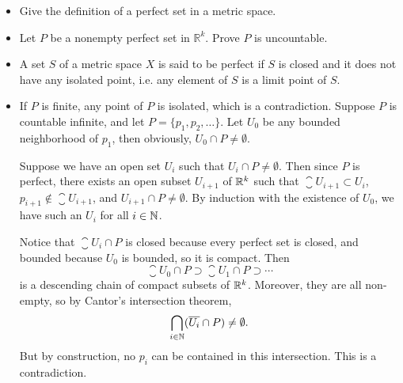 \begin{problem}
\begin{itemize}
    \item[(a)] Give the definition of a perfect set in a metric space.
    \item[(b)] Let $P$ be a nonempty perfect set in $\mathbb{R}^k$. Prove $P$ is uncountable.
\end{itemize}
\begin{solution}
\begin{itemize}
    \item[(a)] A set $S$ of a metric space $X$ is said to be perfect if $S$ is closed and it does not have any isolated point, i.e. any element of $S$ is a limit point of $S.$  
    \item[(b)]If $P$ is finite, any point of $P$ is isolated, which is a contradiction. Suppose $P$ is countable infinite, and let $P = \{p_1, p_2, \ldots\}$. Let $U_0$ be any bounded neighborhood of $p_1$, then obviously, $U_0\cap P\ne\emptyset.$
    
    Suppose we have an open set $U_i$ such that $U_i \cap P \neq
    \emptyset$. Then since $P$ is perfect, there exists an open subset $U_{i+1}$ of $\mathbb{R}^k$ such that $\closure{U_{i+1}} \subset U_i$, $p_{i+1} \notin \closure{U_{i+1}}$, and $U_{i+1} \cap P \neq \emptyset$. By induction with the existence of $U_0$, we have such an $U_i$ for all $i \in \mathbb{N}$.
    
    Notice that $\closure{U_i} \cap P$ is closed because every perfect set is closed, and bounded because $U_0$ is bounded, so it is compact. Then
    $$ \closure{U_0} \cap P \supset \closure{U_1} \cap P \supset \cdots $$
    is a descending chain of compact subsets of $\mathbb{R}^k$. Moreover, they are all non-empty, so by Cantor's intersection theorem,
    $$ \bigcap_{i \in \mathbb{N}} (\overline{U_i} \cap P)\neq \emptyset. $$
    But by construction, no $p_i$ can be contained in this intersection. This is a contradiction.
\end{itemize}
\end{solution}
\end{problem}


